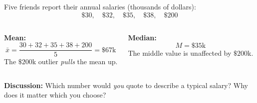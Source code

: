 \documentclass[aspectratio=169, 11pt]{beamer}
\begin{document}
{
\begin{frame}[t, plain]
  \vspace{1em}%
  \hspace{0.55cm}%
  \begin{minipage}{0.9\textwidth}
    \small
    Five friends report their annual salaries (thousands of dollars):
    \[\$30,\quad \$32,\quad \$35,\quad \$38,\quad \$200\]

    \vspace{0.4cm}
    \begin{columns}[t]
        \textbf{\color{navy}Mean:}
        \[\bar{x} = \frac{30+32+35+38+200}{5} = \$67\text{k}\]
        {\small The $\$200$k outlier \textit{pulls} the mean up.}

        \textbf{\color{navy}Median:}
        \[M = \$35\text{k}\]
        {\small The middle value is unaffected by $\$200$k.}
    \end{columns}

    \vspace{0.5cm}
    {\color{navy}\bfseries\small Discussion:} Which number would \textit{you} quote to
    describe a typical salary? Why does it matter which you choose?
  \end{minipage}
\end{frame}
}
\end{document}
